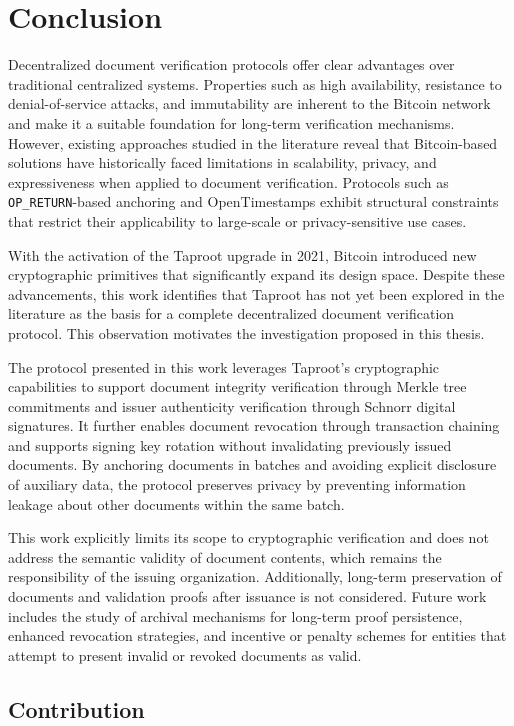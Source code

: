 \section{Conclusion}

Decentralized document verification protocols offer clear advantages over traditional centralized systems.
Properties such as high availability, resistance to denial-of-service attacks, and immutability are inherent to the Bitcoin network and make it a suitable foundation for long-term verification mechanisms.
However, existing approaches studied in the literature reveal that Bitcoin-based solutions have historically faced limitations in scalability, privacy, and expressiveness when applied to document verification.
Protocols such as \texttt{OP\_RETURN}-based anchoring and OpenTimestamps exhibit structural constraints that restrict their applicability to large-scale or privacy-sensitive use cases.

With the activation of the Taproot upgrade in 2021, Bitcoin introduced new cryptographic primitives that significantly expand its design space.
Despite these advancements, this work identifies that Taproot has not yet been explored in the literature as the basis for a complete decentralized document verification protocol.
This observation motivates the investigation proposed in this thesis.

The protocol presented in this work leverages Taproot’s cryptographic capabilities to support document integrity verification through Merkle tree commitments and issuer authenticity verification through Schnorr digital signatures.
It further enables document revocation through transaction chaining and supports signing key rotation without invalidating previously issued documents.
By anchoring documents in batches and avoiding explicit disclosure of auxiliary data, the protocol preserves privacy by preventing information leakage about other documents within the same batch.

This work explicitly limits its scope to cryptographic verification and does not address the semantic validity of document contents, which remains the responsibility of the issuing organization.
Additionally, long-term preservation of documents and validation proofs after issuance is not considered.
Future work includes the study of archival mechanisms for long-term proof persistence, enhanced revocation strategies, and incentive or penalty schemes for entities that attempt to present invalid or revoked documents as valid.

\subsection{Contribution}

